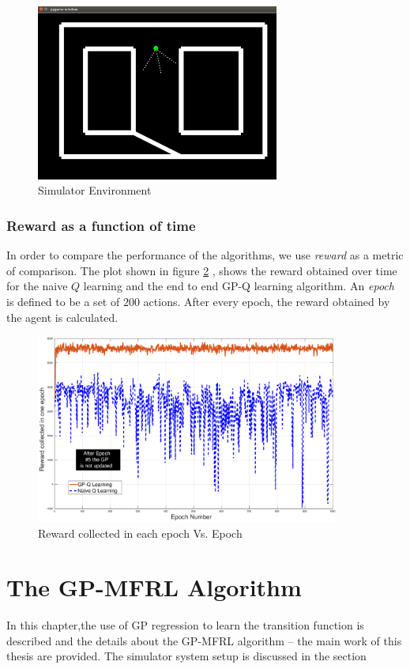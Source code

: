 \documentclass[12pt]{report}
\begin{document}
\begin{figure}[H]
	\centering
	\includegraphics[width=8cm]{gpq_sim.pdf}
	\caption {Simulator Environment}
   \label{fig:gpq_sim}
\end{figure}

\subsection{Reward as a function of time}
In order to compare the performance of the algorithms, we use \textit{reward} as a metric of comparison. The plot shown in figure \ref{fig:gpq_vs_q} , shows the reward obtained over time for the naive $Q$ learning and the end to end GP-Q learning algorithm. An \textit{epoch} is defined to be a set of $200$ actions. After every epoch, the reward obtained by the agent is calculated. 

\begin{figure}[H]
	\centering
	\includegraphics[width=10cm]{gpq_q_reward.eps}
	\caption {Reward collected in each epoch Vs. Epoch}
   \label{fig:gpq_vs_q}
\end{figure}

\chapter{The GP-MFRL Algorithm} %
In this chapter,the use of GP regression to learn the transition function is described and the details about the GP-MFRL algorithm -- the main work of this thesis are provided. The simulator system setup is discussed in the section
\end{document}
